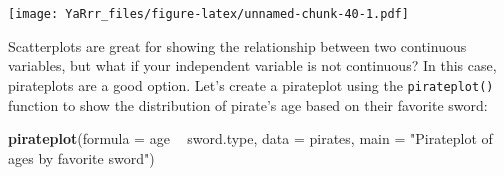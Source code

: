 \documentclass[]{book}
\newenvironment{Shaded}{\begin{snugshade}}{\end{snugshade}}
\newcommand{\KeywordTok}[1]{\textcolor[rgb]{0.13,0.29,0.53}{\textbf{#1}}}
\newcommand{\DataTypeTok}[1]{\textcolor[rgb]{0.13,0.29,0.53}{#1}}
\newcommand{\DecValTok}[1]{\textcolor[rgb]{0.00,0.00,0.81}{#1}}
\newcommand{\StringTok}[1]{\textcolor[rgb]{0.31,0.60,0.02}{#1}}
\newcommand{\CommentTok}[1]{\textcolor[rgb]{0.56,0.35,0.01}{\textit{#1}}}
\newcommand{\OperatorTok}[1]{\textcolor[rgb]{0.81,0.36,0.00}{\textbf{#1}}}
\newcommand{\NormalTok}[1]{#1}
\theoremstyle{definition}
\theoremstyle{definition}
\theoremstyle{remark}
\begin{document}
\begin{Shaded}
\end{Shaded}

\texttt{[image: YaRrr\_files/figure-latex/unnamed-chunk-40-1.pdf]}

Scatterplots are great for showing the relationship between two
continuous variables, but what if your independent variable is not
continuous? In this case, pirateplots are a good option. Let's create a
pirateplot using the \texttt{pirateplot()} function to show the
distribution of pirate's age based on their favorite sword:

\begin{Shaded}
\begin{Highlighting}[]
\KeywordTok{pirateplot}\NormalTok{(}\DataTypeTok{formula =}\NormalTok{ age }\OperatorTok{~}\StringTok{ }\NormalTok{sword.type, }
           \DataTypeTok{data =}\NormalTok{ pirates,}
           \DataTypeTok{main =} \StringTok{"Pirateplot of ages by favorite sword"}\NormalTok{)}
\end{Highlighting}
\end{Shaded}
\end{document}
